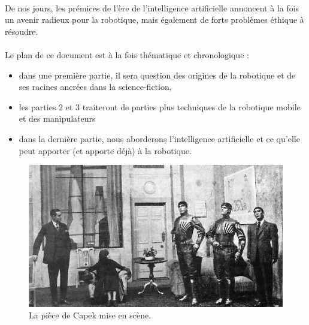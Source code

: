 \documentclass[a4paper,10pt]{article}
\begin{document}
        \paragraph{}
            De nos jours, les prémices de l'ère de l'intelligence artificielle annoncent à la fois
            un avenir radieux pour la robotique, mais également de forts problèmes éthique à résoudre. 
            
        \paragraph{}
            Le plan de ce document est à la fois thématique et chronologique : 
                \begin{itemize}
                    \item dans une première partie, il sera question des origines de la robotique et
                    de ses racines ancrées dans la science-fiction, 
                    \item les parties 2 et 3 traiteront de parties plus techniques de la robotique
                    mobile et des manipulateurs
                    \item dans la dernière partie, nous aborderons l'intelligence artificielle 
                    et ce qu'elle peut apporter (et apporte déjà) à la robotique. 
                \end{itemize}
                
    \newpage
    
    \begin{figure}
                
        \centering
        \includegraphics[width=\textwidth]{Capek_play.jpg}
        \caption{La pièce de Capek mise en scène.}
        \label{fig:capekplay}
    \end{figure}
            
\end{document}

